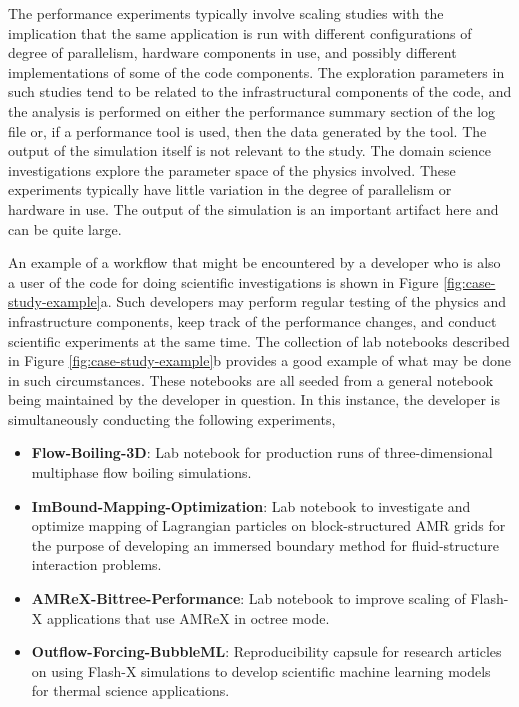 \documentclass{IEEEcsmag}
\begin{document}
The performance experiments typically involve scaling studies with the implication that the same application is run with different configurations of degree of parallelism, hardware components in use, and possibly different implementations of some of the code components. The exploration parameters in such studies tend to be related to the infrastructural components of the code, and the analysis is performed on either the performance summary section of the log file or, if a performance tool is used, then the data generated by the tool. The output of the simulation itself is not relevant to the study. The domain science investigations explore the parameter space of the physics involved. These experiments typically have little variation in the degree of parallelism or hardware in use. The output of the simulation is an important artifact here and can be quite large. 

An example of a workflow that might be encountered by a developer who is also a user of the code for doing scientific investigations is shown in Figure \ref{fig:case-study-example}a. Such developers may perform regular testing of the physics and infrastructure components, keep track of the performance changes, and conduct scientific experiments at the same time.  {\color{red}The collection of lab notebooks \cite{Lab-Notebooks} described in Figure \ref{fig:case-study-example}b provides a good example of what may be done in such circumstances}. These notebooks are all seeded from a general notebook \cite{Multiphysics-Simulations} being maintained by the developer in question. In this instance, the developer is simultaneously conducting the following experiments,

\begin{itemize}
    \item \textbf{Flow-Boiling-3D}: Lab notebook for production runs of three-dimensional multiphase flow boiling simulations.
    \item \textbf{ImBound-Mapping-Optimization}: Lab notebook to investigate and optimize mapping of Lagrangian particles on block-structured AMR grids for the purpose of developing an immersed boundary method for fluid-structure interaction problems.
    \item \textbf{AMReX-Bittree-Performance}: Lab notebook to improve scaling of Flash-X applications that use AMReX in octree mode.
    \item \textbf{Outflow-Forcing-BubbleML}: Reproducibility capsule for research articles on using Flash-X simulations to develop scientific machine learning models for thermal science applications. 
\end{itemize}
\end{document}
